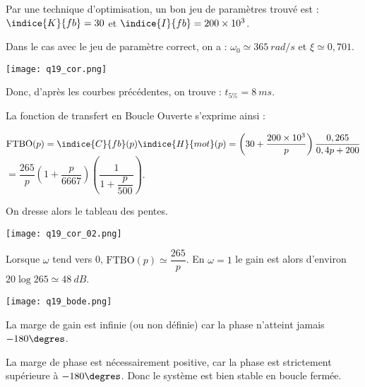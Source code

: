 Par une technique d’optimisation, un bon jeu de paramètres trouvé est : $\indice{K}{fb}=30$ et $\indice{I}{fb}=200\times10^{3}$.
\fi

\ifprof
\begin{corrige}
Dans le cas avec le jeu de paramètre correct, on a : $\omega_0 \simeq \SI{365}{rad/s}$ et  $\xi \simeq 0,701$.

\begin{center}
\texttt{[image: q19\_cor.png]}
\end{center}

Donc, d’après les courbes précédentes, on trouve : $t_{5\%} = \SI{8}{ms}$.

\end{corrige}
\else
\fi

\ifprof
\begin{corrige}
La fonction de transfert en Boucle Ouverte s’exprime ainsi :

$\text{FTBO}(p)=\indice{C}{fb} (p) \indice{H}{mot} (p)=\left(30+\dfrac{200\times 10^3}{p}\right)\dfrac{0,265}{0,4p+200}$ 
$=\dfrac{265}{p}\left(1+\dfrac{p}{6667}\right) \left(\dfrac{1}{1+\dfrac{p}{500}}\right)$.

On dresse alors le tableau des pentes.

\begin{center}
\texttt{[image: q19\_cor\_02.png]}
\end{center}

Lorsque $\omega$ tend vers 0, $\text{FTBO}(p)\simeq \dfrac{265}{p}$. En $\omega=1$ le gain est alors d'environ $20\log 265 \simeq \SI{48}{dB}$.

\begin{center}
\texttt{[image: q19\_bode.png]}
\end{center}

La marge de gain est infinie (ou non définie) car la phase n’atteint jamais $-180\degres$.

La marge de phase est nécessairement positive, car la phase est strictement supérieure à $-180\degres$. Donc le système est bien stable en boucle fermée.
 


\end{corrige}
\else
\fi


